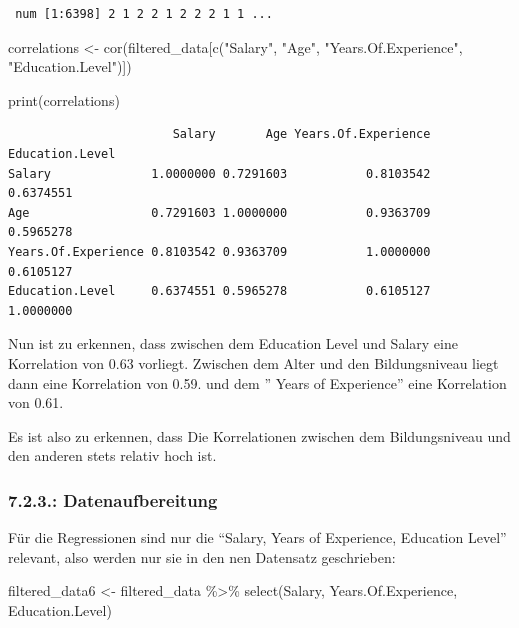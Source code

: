 \documentclass[
  letterpaper,
  DIV=11,
  numbers=noendperiod]{scrartcl}
\newenvironment{Shaded}{\begin{snugshade}}{\end{snugshade}}
\newcommand{\FunctionTok}[1]{\textcolor[rgb]{0.28,0.35,0.67}{#1}}
\newcommand{\NormalTok}[1]{\textcolor[rgb]{0.00,0.23,0.31}{#1}}
\newcommand{\OtherTok}[1]{\textcolor[rgb]{0.00,0.23,0.31}{#1}}
\newcommand{\SpecialCharTok}[1]{\textcolor[rgb]{0.37,0.37,0.37}{#1}}
\newcommand{\StringTok}[1]{\textcolor[rgb]{0.13,0.47,0.30}{#1}}
\begin{document}
\begin{verbatim}
 num [1:6398] 2 1 2 2 1 2 2 2 1 1 ...
\end{verbatim}

\begin{Shaded}
\begin{Highlighting}[]
\NormalTok{correlations }\OtherTok{\textless{}{-}} \FunctionTok{cor}\NormalTok{(filtered\_data[}\FunctionTok{c}\NormalTok{(}\StringTok{"Salary"}\NormalTok{, }\StringTok{"Age"}\NormalTok{, }\StringTok{"Years.Of.Experience"}\NormalTok{, }\StringTok{"Education.Level"}\NormalTok{)])}

\FunctionTok{print}\NormalTok{(correlations)}
\end{Highlighting}
\end{Shaded}

\begin{verbatim}
                       Salary       Age Years.Of.Experience Education.Level
Salary              1.0000000 0.7291603           0.8103542       0.6374551
Age                 0.7291603 1.0000000           0.9363709       0.5965278
Years.Of.Experience 0.8103542 0.9363709           1.0000000       0.6105127
Education.Level     0.6374551 0.5965278           0.6105127       1.0000000
\end{verbatim}

Nun ist zu erkennen, dass zwischen dem Education Level und Salary eine
Korrelation von 0.63 vorliegt. Zwischen dem Alter und den Bildungsniveau
liegt dann eine Korrelation von 0.59. und dem '' Years of Experience''
eine Korrelation von 0.61.

Es ist also zu erkennen, dass Die Korrelationen zwischen dem
Bildungsniveau und den anderen stets relativ hoch ist.

\hypertarget{datenaufbereitung-2}{%
\subsubsection{7.2.3.: Datenaufbereitung}\label{datenaufbereitung-2}}

Für die Regressionen sind nur die ``Salary, Years of Experience,
Education Level'' relevant, also werden nur sie in den nen Datensatz
geschrieben:

\begin{Shaded}
\begin{Highlighting}[]
\NormalTok{filtered\_data6 }\OtherTok{\textless{}{-}}\NormalTok{ filtered\_data }\SpecialCharTok{\%\textgreater{}\%}
  \FunctionTok{select}\NormalTok{(Salary, Years.Of.Experience, Education.Level)}
\end{Highlighting}
\end{Shaded}
\end{document}
